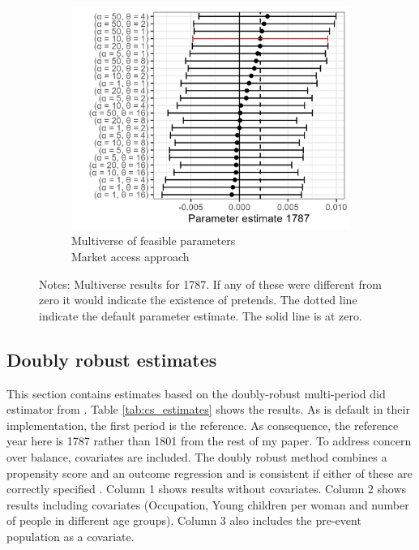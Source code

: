 \begin{figure}[H]
\begin{subfigure}[b]{0.45\textwidth}
    \end{subfigure}
    \vspace{0.45cm}
    \begin{subfigure}[b]{0.45\textwidth}
        \centering
        \caption{Multiverse of feasible parameters\\Market access approach} \label{fig:mult3}
        \includegraphics[width=\textwidth]{Plots/Regression_plots/Multiverse_MA_param_1787.png}
    \end{subfigure}
    \caption*{Notes: Multiverse results for 1787. If any of these were different from zero it would indicate the existence of pretends. The dotted line indicate the default parameter estimate. The solid line is at zero.}
    \label{fig:pop2}
\end{figure}

\FloatBarrier
\subsection{Doubly robust estimates}
This section contains estimates based on the doubly-robust multi-period did estimator from \cite{Callaway2021did}. Table \ref{tab:cs_estimates} shows the results. As is default in their implementation, the first period is the reference. As consequence, the reference year here is 1787 rather than 1801 from the rest of my paper. To address concern over balance, covariates are included. The doubly robust method combines a propensity score and an outcome regression and is consistent if either of these are correctly specified \citep{Santanna2020DRDID}. Column 1 shows results without covariates. Column 2 shows results including covariates (Occupation, Young children per woman and number of people in different age groups). Column 3 also includes the pre-event population as a covariate. 


